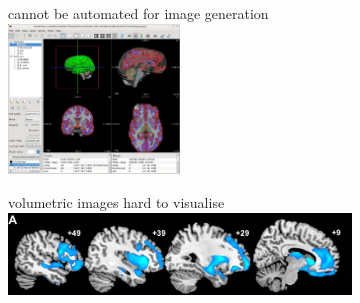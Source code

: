 \documentclass[10pt,xcolor=table,aspectratio=169]{beamer}
\begin{document}
\begin{frame}[t]
\begin{figure}
\begin{subfigure}[t]{0.3\textwidth}
\end{subfigure}
\begin{subfigure}[t]{0.3\textwidth}
\centering
 \begin{minipage}[t][3.5cm][t]{\textwidth}
 \centering
\myno cannot be automated for image generation\\
\includegraphics[width=0.5\textwidth]{images/freeviewInterface.jpg}
 \end{minipage}


% 



\end{subfigure}
\begin{subfigure}[t]{0.3\textwidth}
\centering
 \begin{minipage}[t][3.5cm][t]{\textwidth}
 \centering
\myno volumetric images hard to visualise\\
\vspace{1.5em}
\includegraphics[width=\textwidth]{images/seeleyImages} 
\vspace{1.0em}
 \end{minipage}




\end{subfigure}

\end{figure}
 
\end{frame}
\end{document}
